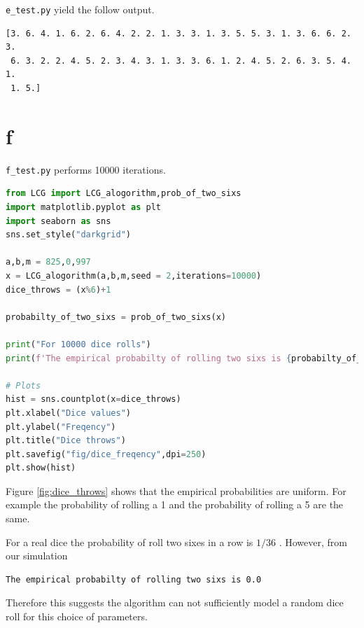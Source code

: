 \documentclass[12pt,a4paper]{article}
\begin{document}
\texttt{e\_test.py} yield the follow output.
\begin{verbatim}
[3. 6. 4. 1. 6. 2. 6. 4. 2. 2. 1. 3. 3. 1. 3. 5. 5. 3. 1. 3. 6. 6. 2. 3.
 6. 3. 2. 2. 4. 5. 2. 3. 4. 3. 1. 3. 3. 6. 1. 2. 4. 5. 2. 6. 3. 5. 4. 1.
 1. 5.]
\end{verbatim}


\section{f}
\texttt{f\_test.py} performs 10000 iterations.
\begin{lstlisting}[language=Python, caption=\texttt{f\_test.py}]
from LCG import LCG_alogorithm,prob_of_two_sixs
import matplotlib.pyplot as plt
import seaborn as sns
sns.set_style("darkgrid")

a,b,m = 825,0,997
x = LCG_alogorithm(a,b,m,seed = 2,iterations=10000)
dice_throws = (x%6)+1

probabilty_of_two_sixs = prob_of_two_sixs(x)

print("For 10000 dice rolls")
print(f'The empirical probabilty of rolling two sixs is {probabilty_of_two_sixs}')

# Plots
hist = sns.countplot(x=dice_throws)
plt.xlabel("Dice values")
plt.ylabel("Freqency")
plt.title("Dice throws")
plt.savefig("fig/dice_freqency",dpi=250)
plt.show(hist)
\end{lstlisting}

Figure \ref{fig:dice_throws} shows that the empirical probabilities are uniform. For example the probability of rolling a 1 and the probability of rolling a 5 are the same.

For a real dice the probability of roll two sixes in a row is $1/36$ . However, from our simulation

\begin{verbatim}
The empirical probabilty of rolling two sixs is 0.0
\end{verbatim}
Therefore this suggests the algorithm can not sufficiently model a random dice roll for this choice of parameters.
\end{document}
